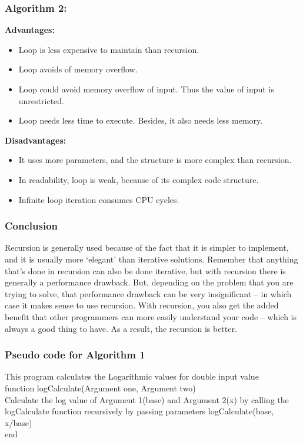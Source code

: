 \documentclass[a4paper, 11pt]{article}
\begin{document}
\subsubsection*{Algorithm 2:}
\textbf{Advantages:}
\begin{itemize}
    \item Loop is less expensive to maintain than recursion.
    \item Loop avoids of memory overflow.
    \item Loop could avoid memory overflow of input. Thus the value of input is unrestricted.
    \item Loop needs less time to execute. Besides, it also needs less memory.
\end{itemize}
\textbf{Disadvantages:}
\begin{itemize}
    \item It uses more parameters, and the structure is more complex than recursion.
    \item In readability, loop is weak, because of its complex code structure.
    \item Infinite loop iteration consumes CPU cycles.
\end{itemize}

\subsubsection*{Conclusion}
Recursion is generally used because of the fact that it is simpler to implement, and it is usually more ‘elegant’ than iterative solutions. Remember that anything that’s done in recursion can also be done iterative, but with recursion there is generally a performance drawback. But, depending on the problem that you are trying to solve, that performance drawback can be very insignificant – in which case it makes sense to use recursion. With recursion, you also get the added benefit that other programmers can more easily understand your code – which is always a good thing to have. As a result, the recursion is better.

\newpage
\subsubsection*{Pseudo code for Algorithm 1}
This program calculates the Logarithmic values for double input value\\ 
  
function logCalculate(Argument one, Argument two){ \\

    Calculate the log value of Argument 1(base) and Argument 2(x) by calling the logCalculate function recursively by passing parameters logCalculate(base, x/base)\\
    
end \\
}
\end{document}
